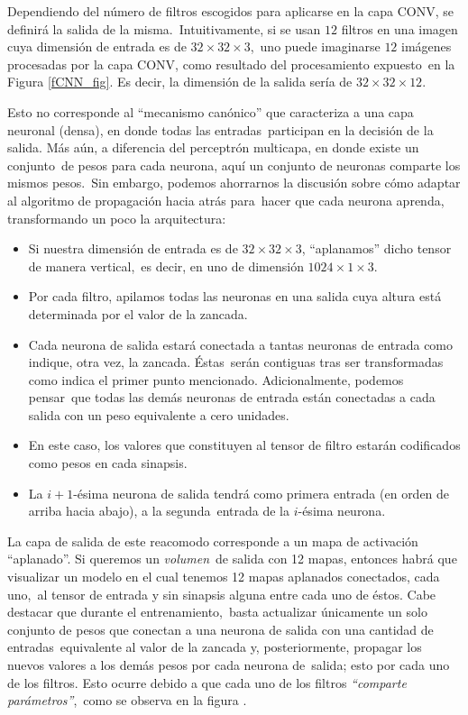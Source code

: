 \noindent
Dependiendo del número de filtros escogidos para aplicarse en la capa CONV, se definirá la salida de la misma.\
Intuitivamente, si se usan $12$ filtros en una imagen cuya dimensión de entrada es de $32 \times 32 \times 3$,\
uno puede imaginarse $12$ imágenes procesadas por la capa CONV, como resultado del procesamiento expuesto\
en la Figura \ref{fCNN_fig}. Es decir, la dimensión de la salida sería de $32 \times 32 \times 12$.\par
Esto no corresponde al ``mecanismo canónico'' que caracteriza a una capa neuronal (densa), en donde todas las entradas\
participan en la decisión de la salida. Más aún, a diferencia del perceptrón multicapa, en donde existe un conjunto\
de pesos para cada neurona, aquí un conjunto de neuronas comparte los mismos pesos.\
Sin embargo, podemos ahorrarnos la discusión sobre cómo adaptar al algoritmo de propagación hacia atrás para\
hacer que cada neurona aprenda, transformando un poco la arquitectura:
\begin{itemize}
\item Si nuestra dimensión de entrada es de $32 \times 32 \times 3$, ``aplanamos'' dicho tensor de manera vertical,\
  es decir, en uno de dimensión $1024 \times 1 \times 3$.
\item Por cada filtro, apilamos todas las neuronas en una salida cuya altura está determinada por el valor de la zancada.
\item Cada neurona de salida estará conectada a tantas neuronas de entrada como indique, otra vez, la zancada. Éstas\
  serán contiguas tras ser transformadas como indica el primer punto mencionado. Adicionalmente, podemos pensar\
  que todas las demás neuronas de entrada están conectadas a cada salida con un peso equivalente a cero unidades.
\item En este caso, los valores que constituyen al tensor de filtro estarán codificados como pesos en cada sinapsis.
\item La $i+1$-ésima neurona de salida tendrá como primera entrada (en orden de arriba hacia abajo), a la segunda\
  entrada de la $i$-ésima neurona.
\end{itemize}\par
La capa de salida de este reacomodo corresponde a un mapa de activación ``aplanado''. Si queremos un \emph{volumen}\
de salida con 12 mapas, entonces habrá que visualizar un modelo en el cual tenemos 12 mapas aplanados conectados, cada uno,\
al tensor de entrada y sin sinapsis alguna entre cada uno de éstos. Cabe destacar que durante el entrenamiento,\
basta actualizar únicamente un solo conjunto de pesos que conectan a una neurona de salida con una cantidad de entradas\
equivalente al valor de la zancada y, posteriormente, propagar los nuevos valores a los demás pesos por cada neurona de\
salida; esto por cada uno de los filtros. Esto ocurre debido a que cada uno de los filtros \emph{``comparte parámetros''},\
como se observa en la figura \label{fCNN_fig}.

